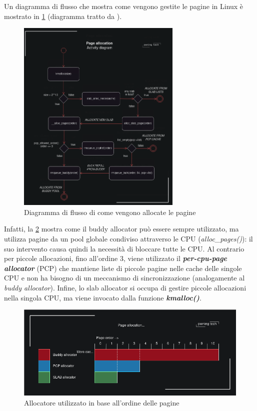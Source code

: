 \documentclass{article}
\begin{document}
Un diagramma di flusso che mostra come vengono gestite le pagine in Linux è mostrato 
in \cref{fig:flowchart-page-allocator} 
(diagramma tratto da \cite{NetfilterTablesVulnerability}).

\begin{figure}[h]
  \begin{center}
    \includegraphics[width=0.7\textwidth]{figures/ch1/activity-diagram-allocator.png}
  \end{center}
  \caption{Diagramma di flusso di come vengono allocate le pagine}\label{fig:flowchart-page-allocator}
\end{figure}


Infatti, la \cref{fig:allocator-per-order}\cite{NetfilterTablesVulnerability}
mostra come il buddy allocator può essere sempre utilizzato, ma utilizza pagine da un pool globale 
condiviso attraverso le CPU (\textit{alloc\_pages()}): il suo intervento causa quindi la 
necessità di bloccare tutte le CPU. Al contrario per piccole allocazioni, fino all'ordine 
$3$, viene utilizzato il \textbf{\textit{per-cpu-page allocator}} (PCP) che mantiene liste 
di piccole pagine nelle cache delle singole CPU e non ha bisogno di un meccanismo di sincronizzazione 
(analogamente al \textit{buddy allocator}). Infine, lo slab allocator si occupa di 
gestire piccole allocazioni nella singola CPU, ma viene invocato dalla funzione 
\textbf{\textit{kmalloc()}}.

\begin{figure}[h]
  \begin{center}
    \includegraphics[width=.75\textwidth]{figures/ch1/allocator-per-order.png}
  \end{center}
  \caption{Allocatore utilizzato in base all'ordine delle pagine}\label{fig:allocator-per-order}
\end{figure}
\end{document}
